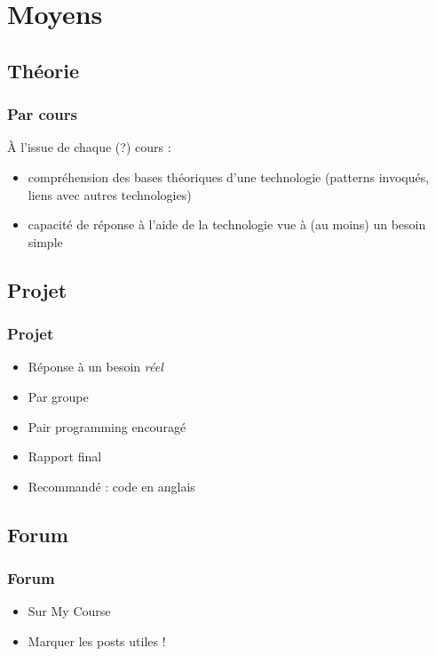 \documentclass[english, french]{beamer}
\begin{document}
\section{Moyens}
\subsection{Théorie}
\begin{frame}
	\frametitle{Par cours}
	À l’issue de chaque (?) cours :
	\begin{itemize}
		\item compréhension des bases théoriques d’une technologie (patterns invoqués, liens avec autres technologies)
		\item capacité de réponse à l’aide de la technologie vue à (au moins) un besoin simple
	\end{itemize}
\end{frame}

\subsection{Projet}
\begin{frame}
	\frametitle{Projet}
	\begin{itemize}
		\item Réponse à un besoin \emph{réel}
		\item Par groupe
		\item Pair programming encouragé
		\item Rapport final
		\item Recommandé : code en anglais
	\end{itemize}
\end{frame}

\subsection{Forum}
\begin{frame}
	\frametitle{Forum}
	\begin{itemize}
		\item Sur My Course
		\item Marquer les posts utiles !
	\end{itemize}
\end{frame}
\end{document}

